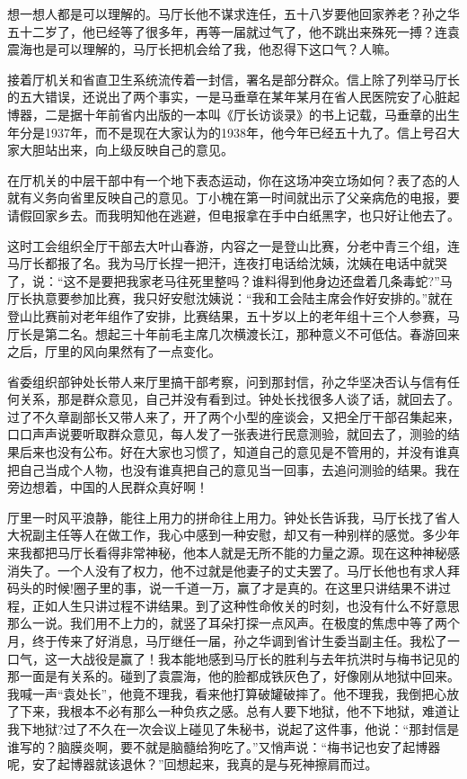 \documentclass[12pt,oneside]{book}
\begin{document}
想一想人都是可以理解的。马厅长他不谋求连任，五十八岁要他回家养老？孙之华五十二岁了，他已经等了很多年，再等一届就过气了，他不跳出来殊死一搏？连袁震海也是可以理解的，马厅长把机会给了我，他忍得下这口气？人嘛。

接着厅机关和省直卫生系统流传着一封信，署名是部分群众。信上除了列举马厅长的五大错误，还说出了两个事实，一是马垂章在某年某月在省人民医院安了心脏起博器，二是据十年前省内出版的一本叫《厅长访谈录》的书上记载，马垂章的出生年分是1937年，而不是现在大家认为的1938年，他今年已经五十九了。信上号召大家大胆站出来，向上级反映自己的意见。

在厅机关的中层干部中有一个地下表态运动，你在这场冲突立场如何？表了态的人就有义务向省里反映自己的意见。丁小槐在第一时间就出示了父亲病危的电报，要请假回家乡去。而我明知他在逃避，但电报拿在手中白纸黑字，也只好让他去了。

这时工会组织全厅干部去大叶山春游，内容之一是登山比赛，分老中青三个组，连马厅长都报了名。我为马厅长捏一把汗，连夜打电话给沈姨，沈姨在电话中就哭了，说：``这不是要把我家老马往死里整吗？谁料得到他身边还盘着几条毒蛇?''马厅长执意要参加比赛，我只好安慰沈姨说：``我和工会陆主席会作好安排的。''就在登山比赛前对老年组作了安排，比赛结果，五十岁以上的老年组十三个人参赛，马厅长是第二名。想起三十年前毛主席几次横渡长江，那种意义不可低估。春游回来之后，厅里的风向果然有了一点变化。

省委组织部钟处长带人来厅里搞干部考察，问到那封信，孙之华坚决否认与信有任何关系，那是群众意见，自己并没有看到过。钟处长找很多人谈了话，就回去了。过了不久章副部长又带人来了，开了两个小型的座谈会，又把全厅干部召集起来，口口声声说要听取群众意见，每人发了一张表进行民意测验，就回去了，测验的结果后来也没有公布。好在大家也习惯了，知道自己的意见是不管用的，并没有谁真把自己当成个人物，也没有谁真把自己的意见当一回事，去追问测验的结果。我在旁边想着，中国的人民群众真好啊！

厅里一时风平浪静，能往上用力的拼命往上用力。钟处长告诉我，马厅长找了省人大祝副主任等人在做工作，我心中感到一种安慰，却又有一种别样的感觉。多少年来我都把马厅长看得非常神秘，他本人就是无所不能的力量之源。现在这种神秘感消失了。一个人没有了权力，他不过就是他妻子的丈夫罢了。马厅长他也有求人拜码头的时候!圈子里的事，说一千道一万，赢了才是真的。在这里只讲结果不讲过程，正如人生只讲过程不讲结果。到了这种性命攸关的时刻，也没有什么不好意思那么一说。我们用不上力的，就竖了耳朵打探一点风声。在极度的焦虑中等了两个月，终于传来了好消息，马厅继任一届，孙之华调到省计生委当副主任。我松了一口气，这一大战役是赢了！我本能地感到马厅长的胜利与去年抗洪时与梅书记见的那一面是有关系的。碰到了袁震海，他的脸都成铁灰色了，好像刚从地狱中回来。我喊一声``袁处长''，他竟不理我，看来他打算破罐破摔了。他不理我，我倒把心放了下来，我根本不必有那么一种负疚之感。总有人要下地狱，他不下地狱，难道让我下地狱?过了不久在一次会议上碰见了朱秘书，说起了这件事，他说：``那封信是谁写的？脑膜炎啊，要不就是脑髓给狗吃了。''又悄声说：``梅书记也安了起博器呢，安了起博器就该退休？''回想起来，我真的是与死神擦肩而过。
\end{document}
